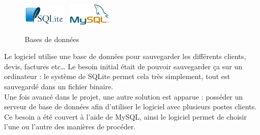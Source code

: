 \begin{figure}
\begin{center}
\includegraphics[width=0.18\textwidth]{../beamer/logos/sqlite.png}~
\includegraphics[width=0.18\textwidth]{../beamer/logos/mysql.png}
\end{center}
\caption{Bases de données}
\end{figure}
Le logiciel utilise une base de données pour sauvegarder les différents clients, devis, factures etc… Le besoin initial était de pouvoir
sauvegarder ça sur un ordinateur : le système de SQLite permet cela très simplement, tout est sauvegardé dans un fichier binaire.\\ Une fois
avancé dans le projet, une autre solution est apparue : posséder un serveur de base de données afin d'utiliser le logiciel avec plusieurs
postes clients. Ce besoin a été couvert à l'aide de MySQL, ainsi le logiciel permet de choisir l'une ou l'autre des manières de procéder.


